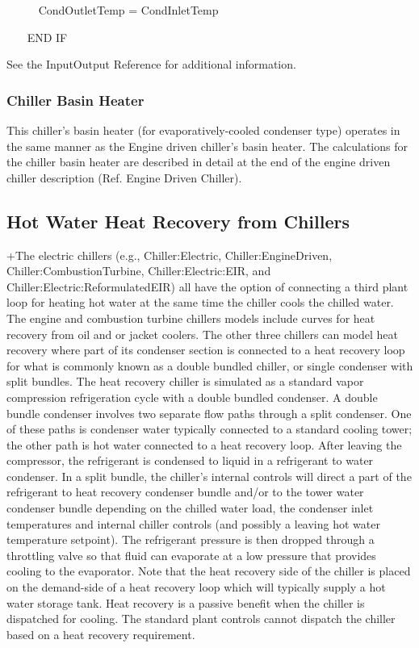 ~~~~~ CondOutletTemp = CondInletTemp

~~~ END IF

See the InputOutput Reference for additional information.

\subsubsection{Chiller Basin Heater}\label{chiller-basin-heater-1}

This chiller's basin heater (for evaporatively-cooled condenser type) operates in the same manner as the Engine driven chiller's basin heater. The calculations for the chiller basin heater are described in detail at the end of the engine driven chiller description (Ref. Engine Driven Chiller).

\subsection{Hot Water Heat Recovery from Chillers}\label{hot-water-heat-recovery-from-chillers}

+The electric chillers (e.g., Chiller:Electric, Chiller:EngineDriven, Chiller:CombustionTurbine, Chiller:Electric:EIR, and Chiller:Electric:ReformulatedEIR) all have the option of connecting a third plant loop for heating hot water at the same time the chiller cools the chilled water. The engine and combustion turbine chillers models include curves for heat recovery from oil and or jacket coolers. The other three chillers can model heat recovery where part of its condenser section is connected to a heat recovery loop for what is commonly known as a double bundled chiller, or single condenser with split bundles. The heat recovery chiller is simulated as a standard vapor compression refrigeration cycle with a double bundled condenser. A double bundle condenser involves two separate flow paths through a split condenser. One of these paths is condenser water typically connected to a standard cooling tower; the other path is hot water connected to a heat recovery loop. After leaving the compressor, the refrigerant is condensed to liquid in a refrigerant to water condenser. In a split bundle, the chiller's internal controls will direct a part of the refrigerant to heat recovery condenser bundle and/or to the tower water condenser bundle depending on the chilled water load, the condenser inlet temperatures and internal chiller controls (and possibly a leaving hot water temperature setpoint). The refrigerant pressure is then dropped through a throttling valve so that fluid can evaporate at a low pressure that provides cooling to the evaporator. Note that the heat recovery side of the chiller is placed on the demand-side of a heat recovery loop which will typically supply a hot water storage tank. Heat recovery is a passive benefit when the chiller is dispatched for cooling. The standard plant controls cannot dispatch the chiller based on a heat recovery requirement.

